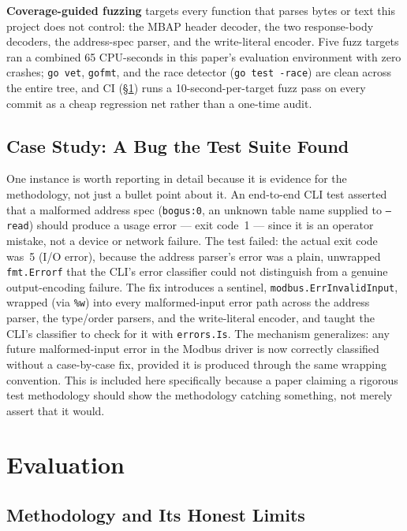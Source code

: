 \documentclass[10pt,conference]{IEEEtran}
\newcommand{\code}[1]{\texttt{#1}}
\begin{document}
\textbf{Coverage-guided fuzzing} targets every function that parses
bytes or text this project does not control: the MBAP header decoder,
the two response-body decoders, the address-spec parser, and the
write-literal encoder. Five fuzz targets ran a combined 65 CPU-seconds
in this paper's evaluation environment with zero crashes; \code{go
vet}, \code{gofmt}, and the race detector (\code{go test -race}) are
clean across the entire tree, and CI (\S\ref{sec:evaluation}) runs a
10-second-per-target fuzz pass on every commit as a cheap regression
net rather than a one-time audit.

\subsection{Case Study: A Bug the Test Suite Found}

One instance is worth reporting in detail because it is evidence for
the methodology, not just a bullet point about it. An end-to-end CLI
test asserted that a malformed address spec (\code{bogus:0}, an
unknown table name supplied to \code{--read}) should produce a usage
error --- exit code~1 --- since it is an operator mistake, not a device
or network failure. The test failed: the actual exit code was~5 (I/O
error), because the address parser's error was a plain, unwrapped
\code{fmt.Errorf} that the CLI's error classifier could not distinguish
from a genuine output-encoding failure. The fix introduces a sentinel,
\code{modbus.ErrInvalidInput}, wrapped (via \code{\%w}) into every
malformed-input error path across the address parser, the type/order
parsers, and the write-literal encoder, and taught the CLI's classifier
to check for it with \code{errors.Is}. The mechanism generalizes: any
future malformed-input error in the Modbus driver is now
correctly classified without a case-by-case fix, provided it is
produced through the same wrapping convention. This is included here
specifically because a paper claiming a rigorous test methodology
should show the methodology catching something, not merely assert that
it would.



\section{Evaluation}
\label{sec:evaluation}

\subsection{Methodology and Its Honest Limits}
\end{document}
